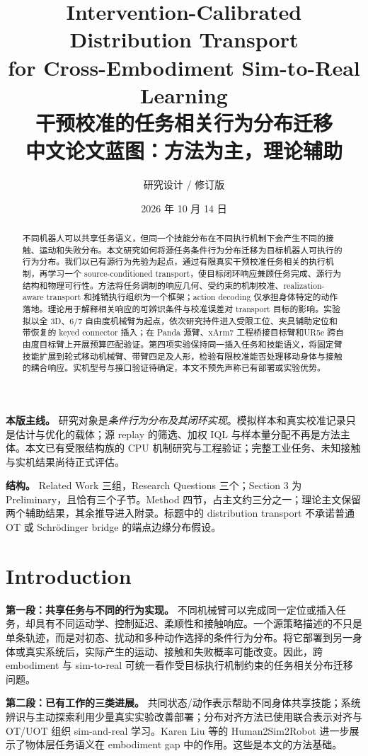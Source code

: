 \documentclass[11pt]{article}
\title{\vspace{-1em}\textbf{Intervention-Calibrated Distribution Transport\\for Cross-Embodiment Sim-to-Real Learning}\\[0.6em]
\large 干预校准的任务相关行为分布迁移\\[0.4em]
\normalsize 中文论文蓝图：方法为主，理论辅助}
\author{研究设计 / 修订版}
\date{2026 年 10 月 14 日}
\begin{document}
\maketitle
\vspace{-1em}
\begin{abstract}
不同机器人可以共享任务语义，但同一个技能分布在不同执行机制下会产生不同的接触、运动和失败分布。本文研究如何将源任务条件行为分布迁移为目标机器人可执行的行为分布。我们以已有源行为先验为起点，通过有限真实干预校准任务相关的执行机制，再学习一个 source-conditioned transport，使目标闭环响应兼顾任务完成、源行为结构和物理可行性。方法将任务调制的响应几何、受约束的机制校准、realization-aware transport 和摊销执行组织为一个框架；action decoding 仅承担身体特定的动作落地。理论用于解释相关响应的可辨识条件与校准误差对 transport 目标的影响。实验拟以全 3D、6/7 自由度机械臂为起点，依次研究持件进入受限工位、夹具辅助定位和带恢复的 keyed connector 插入；在 Panda 源臂、xArm7 工程桥接目标臂和UR5e 跨自由度目标臂上开展预算匹配验证。第四项实验保持同一插入任务和技能语义，将固定臂技能扩展到轮式移动机械臂、带臂四足及人形，检验有限校准能否处理移动身体与接触的耦合响应。实机型号与接口验证待确定，本文不预先声称已有部署或实验优势。
\end{abstract}
\textbf{本版主线。} 研究对象是\emph{条件行为分布及其闭环实现}。模拟样本和真实校准记录只是估计与优化的载体；源 replay 的筛选、加权 IQL 与样本量分配不再是方法主体。本文已有受限结构族的 CPU 机制研究与工程验证；完整工业任务、未知接触与实机结果尚待正式评估。

\textbf{结构。} Related Work 三组，Research Questions 三个；Section 3 为 Preliminary，且恰有三个子节。Method 四节，占主文约三分之一；理论主文保留两个辅助结果，其余推导进入附录。标题中的 distribution transport 不承诺普通 OT 或 Schr\"odinger bridge 的端点边缘分布假设。
\tableofcontents
\newpage

\section{Introduction}
\label{sec:intro}
\textbf{第一段：共享任务与不同的行为实现。} 不同机械臂可以完成同一定位或插入任务，却具有不同运动学、控制延迟、柔顺性和接触响应。一个源策略描述的不只是单条轨迹，而是对初态、扰动和多种动作选择的条件行为分布。将它部署到另一身体或真实系统后，实际产生的运动、接触和失败概率可能改变。因此，跨 embodiment 与 sim-to-real 可统一看作受目标执行机制约束的任务相关分布迁移问题。

\textbf{第二段：已有工作的三类进展。} 共同状态/动作表示帮助不同身体共享技能\cite{lsa,lad,xskill}；系统辨识与主动探索利用少量真实实验改善部署\cite{asid,spi,optimalexploration}；分布对齐方法已使用联合表示对齐与 OT/UOT 组织 sim-and-real 学习\cite{otreal}。Karen Liu 等的 Human2Sim2Robot 进一步展示了物体层任务语义在 embodiment gap 中的作用\cite{human2sim}。这些是本文的方法基础。
\end{document}
